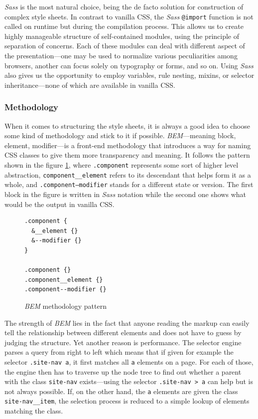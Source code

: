 \documentclass[thesis=M,english,hidelinks]{FITthesis}[2012/10/20]
\newcommand{\code}{\texttt}
\begin{document}
\textit{Sass} is the most natural choice, being the de facto solution for construction of complex style sheets. In contrast to vanilla CSS, the \textit{Sass} \code{@import} function is not called on runtime but during the compilation process. This allows us to create highly manageable structure of self-contained modules, using the principle of separation of concerns. Each of these modules can deal with different aspect of the presentation---one may be used to normalize various peculiarities among browsers, another can focus solely on typography or forms, and so on. Using \textit{Sass} also gives us the opportunity to employ variables, rule nesting, mixins, or selector inheritance---none of which are available in vanilla CSS.

    \subsubsection{Methodology}

When it comes to structuring the style sheets, it is always a good idea to choose some kind of methodology and stick to it if possible. \textit{BEM}---meaning block, element, modifier---is a front-end methodology that introduces a way for naming CSS classes to give them more transparency and meaning. It follows the pattern shown in the figure \ref{fig:bem_pattern}, where \code{.component} represents some sort of higher level abstraction, \code{component\_\_element} refers to its descendant that helps form it as a whole, and \code{.component--modifier} stands for a different state or version. The first block in the figure is written in \textit{Sass} notation while the second one shows what would be the output in vanilla CSS.

\begin{figure}[h]
  \begin{lstlisting}
.component {
  &__element {}
  &--modifier {}
}

.component {}
.component__element {}
.component--modifier {}
  \end{lstlisting}
  \caption{\textit{BEM} methodology pattern}
  \label{fig:bem_pattern}
\end{figure}

The strength of \textit{BEM} lies in the fact that anyone reading the markup can easily tell the relationship between different elements and does not have to guess by judging the structure. Yet another reason is performance. The selector engine parses a query from right to left which means that if given for example the selector \code{.site-nav a}, it first matches all \code{a} elements on a page. For each of those, the engine then has to traverse up the node tree to find out whether a parent with the class \code{site-nav} exists---using the selector \code{.site-nav > a} can help but is not always possible. If, on the other hand, the \code{a} elements are given the class \code{site-nav\_\_item}, the selection process is reduced to a simple lookup of elements matching the class.
\end{document}

